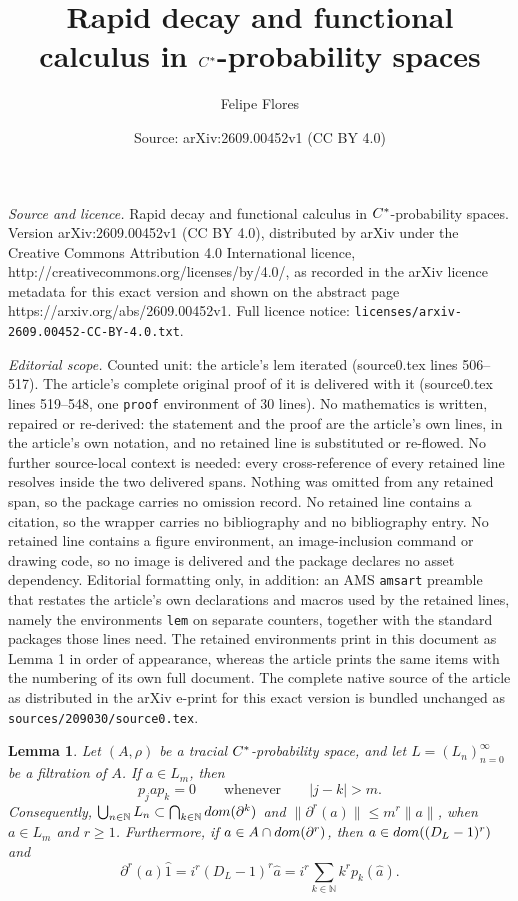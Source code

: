 \documentclass[10pt,a4paper]{amsart}
\title{Rapid decay and functional calculus in ${\rm C}^*$-probability spaces}
\author{Felipe Flores}
\date{Source: arXiv:2609.00452v1 (CC BY 4.0)}
\newtheorem{lem}{Lemma}
\begin{document}
\maketitle

\noindent\emph{Source and licence.} Rapid decay and functional calculus in ${\rm C}^*$-probability spaces. Version arXiv:2609.00452v1 (CC BY 4.0), distributed by arXiv under the Creative Commons Attribution 4.0 International licence, http://creativecommons.org/licenses/by/4.0/, as recorded in the arXiv licence metadata for this exact version and shown on the abstract page https://arxiv.org/abs/2609.00452v1. Full licence notice: \texttt{licenses/arxiv-2609.00452-CC-BY-4.0.txt}.\par\smallskip

\noindent\textit{Editorial scope.} Counted unit: the article's lem iterated (source0.tex lines 506--517). The article's complete original proof of it is delivered with it (source0.tex lines 519--548, one \texttt{proof} environment of 30 lines). No mathematics is written, repaired or re-derived: the statement and the proof are the article's own lines, in the article's own notation, and no retained line is substituted or re-flowed.  No further source-local context is needed: every cross-reference of every retained line resolves inside the two delivered spans.  Nothing was omitted from any retained span, so the package carries no omission record.  No retained line contains a citation, so the wrapper carries no bibliography and no bibliography entry.  No retained line contains a figure environment, an image-inclusion command or drawing code, so no image is delivered and the package declares no asset dependency.  Editorial formatting only, in addition: an AMS \texttt{amsart} preamble that restates the article's own declarations and macros used by the retained lines, namely the environments \texttt{lem} on separate counters, together with the standard packages those lines need.  The retained environments print in this document as Lemma 1 in order of appearance, whereas the article prints the same items with the numbering of its own full document.  The complete native source of the article as distributed in the arXiv e-print for this exact version is bundled unchanged as \texttt{sources/209030/source0.tex}.
\begin{lem}\label{iterated}
Let $(A,\rho)$ be a tracial ${\rm C}^*$-probability space, and let
$L=(L_n)_{n=0}^\infty$ be a filtration of $A$.  If $a\in L_m$, then
\begin{equation*}
 p_jap_k=0
 \qquad\text{whenever}\qquad |j-k|>m.
\end{equation*}
Consequently, $\bigcup_{n\in\mathbb N}{L_n} \subset\bigcap_{k\in\mathbb N}{\rm dom}(\partial^k)$ and $ \|\partial^r(a)\|\leq m^r\|a\|$, when $a\in L_m$ and $r\geq1$. Furthermore, if $a\in A\cap{\rm dom}(\partial^r)$, then $a\in{\rm dom}((D_L-1)^r)$ and
\begin{equation*}
 \partial^r(a)\hat 1=i^r(D_L-1)^r\hat a=i^r\sum_{k\in\mathbb N}k^rp_k(\hat a).
\end{equation*}
\end{lem}
\end{document}
